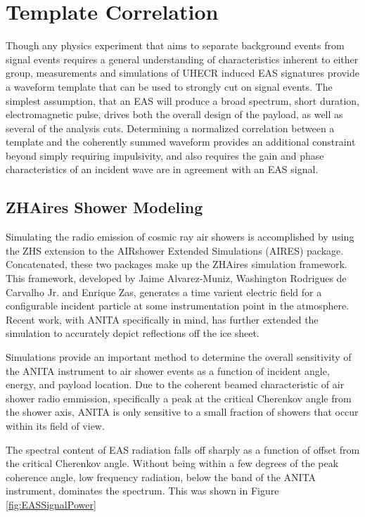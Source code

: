 \section{Template Correlation}
	Though any physics experiment that aims to separate background events from signal events requires a general understanding of characteristics inherent to either group, measurements and simulations of UHECR induced EAS signatures provide a waveform template that can be used to strongly cut on signal events.  The simplest assumption, that an EAS will produce a broad spectrum, short duration, electromagnetic pulse, drives both the overall design of the payload, as well as several of the analysis cuts.  Determining a normalized correlation between a template and the coherently summed waveform provides an additional constraint beyond simply requiring impulsivity, and also requires the gain and phase characteristics of an incident wave are in agreement with an EAS signal.

	\subsection{ZHAires Shower Modeling}
		Simulating the radio emission of cosmic ray air showers is accomplished by using the ZHS extension to the AIRshower Extended Simulations (AIRES) package.\cite{AlvarezMuñiz2012325}  Concatenated, these two packages make up the ZHAires simulation framework.  This framework, developed by Jaime Alvarez-Muniz, Washington Rodrigues de Carvalho Jr. and Enrique Zas, generates a time varient electric field for a configurable incident particle at some instrumentation point in the atmosphere.  Recent work, with ANITA specifically in mind, has further extended the simulation to accurately depict reflections off the ice sheet.
		
		Simulations provide an important method to determine the overall sensitivity of the ANITA instrument to air shower events as a function of incident angle, energy, and payload location.  Due to the coherent beamed characteristic of air shower radio emmission, specifically a peak at the critical Cherenkov angle from the shower axis, ANITA is only sensitive to a small fraction of showers that occur within its field of view.
		
		The spectral content of EAS radiation falls off sharply as a function of offset from the critical Cherenkov angle.  Without being within a few degrees of the peak coherence angle, low frequency radiation, below the band of the ANITA instrument, dominates the spectrum.  This was shown in Figure \ref{fig:EASSignalPower}

